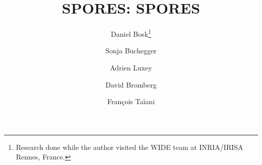 \title{%
  \acs*{SPORES}: \acl*{SPORES}%
}


\author[1]{Daniel Bosk\thanks{%
    Research done while the author visited the WIDE team at INRIA/IRISA Rennes, 
    France.
  }}
\author[1]{Sonja Buchegger}
\author[2]{Adrien Luxey}
\author[2]{David Bromberg}
\author[2]{François Taïani}

